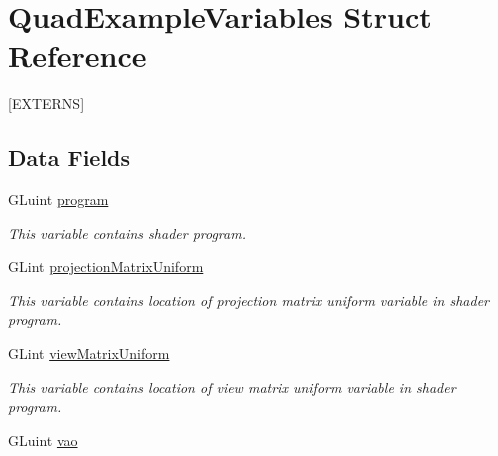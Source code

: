 \hypertarget{structQuadExampleVariables}{}\section{Quad\+Example\+Variables Struct Reference}
\label{structQuadExampleVariables}


\mbox{[}E\+X\+T\+E\+R\+N\+S\mbox{]}  


\subsection*{Data Fields}
\begin{DoxyCompactItemize}
\item 
\hypertarget{structQuadExampleVariables_a63971781ff860bd201886926f943ba78}{}G\+Luint \hyperlink{structQuadExampleVariables_a63971781ff860bd201886926f943ba78}{program}\label{structQuadExampleVariables_a63971781ff860bd201886926f943ba78}

\begin{DoxyCompactList}\small\item\em This variable contains shader program. \end{DoxyCompactList}\item 
\hypertarget{structQuadExampleVariables_a38a1023cb8ee3692e195ea574e43c51a}{}G\+Lint \hyperlink{structQuadExampleVariables_a38a1023cb8ee3692e195ea574e43c51a}{projection\+Matrix\+Uniform}\label{structQuadExampleVariables_a38a1023cb8ee3692e195ea574e43c51a}

\begin{DoxyCompactList}\small\item\em This variable contains location of projection matrix uniform variable in shader program. \end{DoxyCompactList}\item 
\hypertarget{structQuadExampleVariables_a9c505e0a089ecd495b18550309ebab77}{}G\+Lint \hyperlink{structQuadExampleVariables_a9c505e0a089ecd495b18550309ebab77}{view\+Matrix\+Uniform}\label{structQuadExampleVariables_a9c505e0a089ecd495b18550309ebab77}

\begin{DoxyCompactList}\small\item\em This variable contains location of view matrix uniform variable in shader program. \end{DoxyCompactList}\item 
\hypertarget{structQuadExampleVariables_a294c388653d62435d7eeb7994f45c4fc}{}G\+Luint \hyperlink{structQuadExampleVariables_a294c388653d62435d7eeb7994f45c4fc}{vao}\label{structQuadExampleVariables_a294c388653d62435d7eeb7994f45c4fc}


\end{DoxyCompactItemize}
